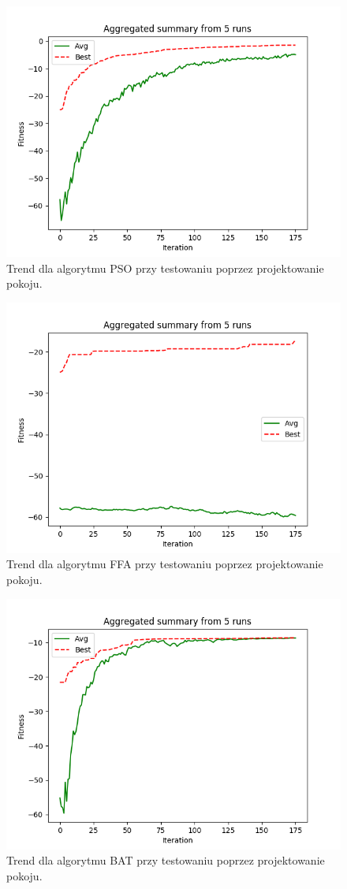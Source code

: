 \begin{figure}[H]
	\centering
	\includegraphics[width=0.7\linewidth]{analysis/room/pso_room/pso_room}
	\caption{Trend dla algorytmu PSO przy testowaniu poprzez projektowanie pokoju.}
	\label{fig:pso_room}
\end{figure}

\begin{figure}[H]
	\centering
	\includegraphics[width=0.7\linewidth]{analysis/room/ffa_room/ffa_room}
	\caption{Trend dla algorytmu FFA przy testowaniu poprzez projektowanie pokoju.}
	\label{fig:ffa_room}
\end{figure}

\begin{figure}[H]
	\centering
	\includegraphics[width=0.7\linewidth]{analysis/room/bat_room/bat_room}
	\caption{Trend dla algorytmu BAT przy testowaniu poprzez projektowanie pokoju.}
	\label{fig:bat_room}
\end{figure}
